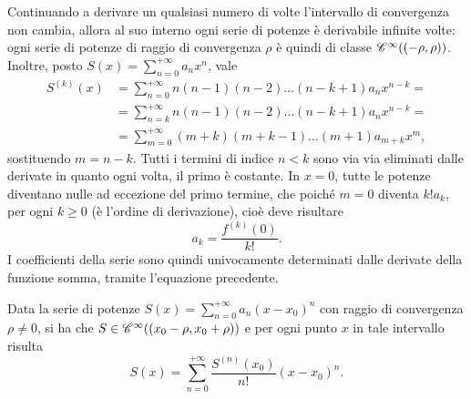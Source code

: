 Continuando a derivare un qualsiasi numero di volte l'intervallo di convergenza non cambia, allora al suo interno ogni serie di potenze è derivabile infinite volte: ogni serie di potenze di raggio di convergenza $\rho$ è quindi di classe $\cont[\infty]{(-\rho,\rho)}$. Inoltre, posto $S(x)=\sum_{n=0}^{+\infty}a_nx^n$, vale
\[\begin{split}
S^{(k)}(x)	&=\sum_{n=0}^{+\infty}n(n-1)(n-2)\dots(n-k+1)a_nx^{n-k}=\\
			&=\sum_{n=k}^{+\infty}n(n-1)(n-2)\dots(n-k+1)a_nx^{n-k}=\\
			&=\sum_{m=0}^{+\infty}(m+k)(m+k-1)\dots(m+1)a_{m+k}x^m,
\end{split}\]
sostituendo $m=n-k$. Tutti i termini di indice $n<k$ sono via via eliminati dalle derivate in quanto ogni volta, il primo è costante.
In $x=0$, tutte le potenze diventano nulle ad eccezione del primo termine, che poiché $m=0$ diventa $k!a_k$, per ogni $k\geq 0$ (è l'ordine di derivazione), cioè deve risultare
\[
a_k=\frac{f^{(k)}(0)}{k!}.
\]
I coefficienti della serie sono quindi univocamente determinati dalle derivate della funzione somma, tramite l'equazione precedente.
\begin{teorema}
	Data la serie di potenze $S(x)=\sum_{n=0}^{+\infty}a_n(x-x_0)^n$ con raggio di convergenza $\rho\ne 0$, si ha che $S\in\cont[\infty]{(x_0-\rho,x_0+\rho)}$ e per ogni punto $x$ in tale intervallo risulta
	\begin{equation} \label{eq:serie_potenze_taylor}
		S(x)=\sum_{n=0}^{+\infty}\frac{S^{(n)}(x_0)}{n!}(x-x_0)^n.
	\end{equation}
\end{teorema}
